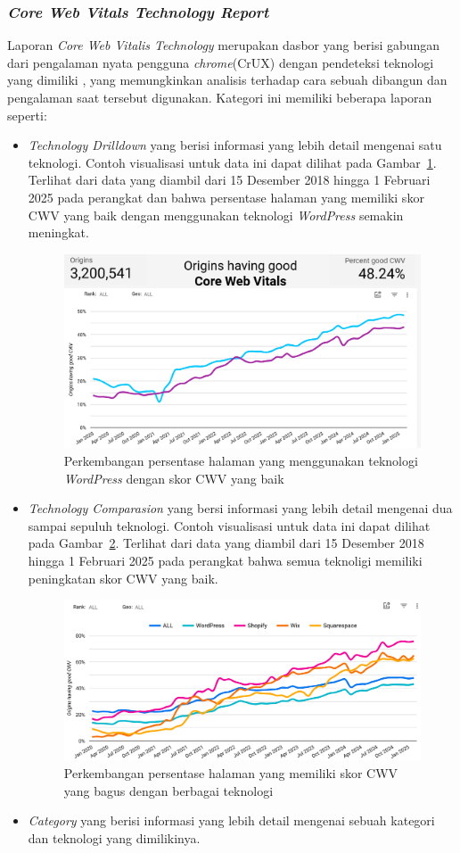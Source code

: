 \subsubsection{\textit{Core Web Vitals Technology Report}}
\label{subsub:cwv}
Laporan \textit{Core Web Vitalis Technology} merupakan dasbor yang berisi gabungan dari pengalaman nyata pengguna \textit{chrome}(CrUX) dengan pendeteksi teknologi \web yang dimiliki \http, yang memungkinkan analisis terhadap cara sebuah \web dibangun dan pengalaman saat \web tersebut digunakan. Kategori ini memiliki beberapa laporan seperti:
\begin{itemize}
    \item \textit{Technology Drilldown} yang berisi informasi yang lebih detail mengenai satu teknologi. Contoh visualisasi untuk data ini dapat dilihat pada Gambar~\ref{fig:techdrill}. Terlihat dari data yang diambil dari 15 Desember 2018 hingga 1 Februari 2025 pada perangkat \desktop dan \mobile bahwa persentase halaman yang memiliki skor CWV yang baik dengan menggunakan teknologi \textit{WordPress} semakin meningkat.
        \begin{figure}[H]
            \centering
            \includegraphics[width=0.4\linewidth]{Gambar/Contoh TechDrill.png}
            \caption{Perkembangan persentase halaman \web yang menggunakan teknologi \textit{WordPress} dengan skor CWV yang baik}
            \label{fig:techdrill}
        \end{figure}

    \item \textit{Technology Comparasion} yang bersi informasi yang lebih detail mengenai dua sampai sepuluh teknologi. Contoh visualisasi untuk data ini dapat dilihat pada Gambar~\ref{fig:techcompar}. Terlihat dari data yang diambil dari 15 Desember 2018 hingga 1 Februari 2025 pada perangkat \mobile bahwa semua teknoligi memiliki peningkatan skor CWV yang baik.
        \begin{figure}[H]
            \centering
            \includegraphics[width=0.4\linewidth]{Gambar/Contoh Tech Compar.png}
            \caption{Perkembangan persentase halaman \web yang memiliki skor CWV yang bagus dengan berbagai teknologi}
            \label{fig:techcompar}
        \end{figure}

    \item \textit{Category} yang berisi informasi yang lebih detail mengenai sebuah kategori dan teknologi yang dimilikinya.
\end{itemize}


